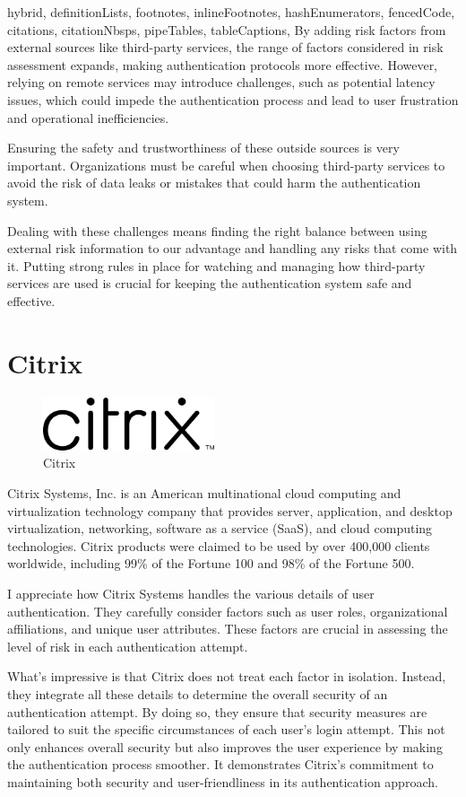 \documentclass[
  digital,     %
  oneside,     %
  nosansbold,  %
  nocolorbold, %
  lof,         %
  lot,         %
]{fithesis4}
\begin{document}
\begin{markdown*}{%
  hybrid,
  definitionLists,
  footnotes,
  inlineFootnotes,
  hashEnumerators,
  fencedCode,
  citations,
  citationNbsps,
  pipeTables,
  tableCaptions,
}
By adding risk factors from external sources like third-party services, the range of factors considered in risk assessment expands, making authentication protocols more effective.
However, relying on remote services may introduce challenges, such as potential latency issues, which could impede the authentication process and lead to user frustration and operational inefficiencies.

Ensuring the safety and trustworthiness of these outside sources is very important.
Organizations must be careful when choosing third-party services to avoid the risk of data leaks or mistakes that could harm the authentication system.

Dealing with these challenges means finding the right balance between using external risk information to our advantage and handling any risks that come with it.
Putting strong rules in place for watching and managing how third-party services are used is crucial for keeping the authentication system safe and effective.

\newpage
\section{Citrix}

\begin{figure}[htbp]
  \centering
  \includegraphics[width=0.45\textwidth]{img/citrix.png}
  \caption{Citrix}
  \label{fig:citrix-logo}
\end{figure}

Citrix Systems, Inc. is an American multinational cloud computing and virtualization technology company that provides server, application, and desktop virtualization, networking, software as a service (SaaS), and cloud computing technologies.
Citrix products were claimed to be used by over 400,000 clients worldwide, including 99\% of the Fortune 100 and 98\% of the Fortune 500.

I appreciate how Citrix Systems handles the various details of user authentication.
They carefully consider factors such as user roles, organizational affiliations, and unique user attributes.
These factors are crucial in assessing the level of risk in each authentication attempt.

What's impressive is that Citrix does not treat each factor in isolation.
Instead, they integrate all these details to determine the overall security of an authentication attempt.
By doing so, they ensure that security measures are tailored to suit the specific circumstances of each user's login attempt. This not only enhances overall security but also improves the user experience by making the authentication process smoother.
It demonstrates Citrix's commitment to maintaining both security and user-friendliness in its authentication approach.


\end{markdown*}
\end{document}
